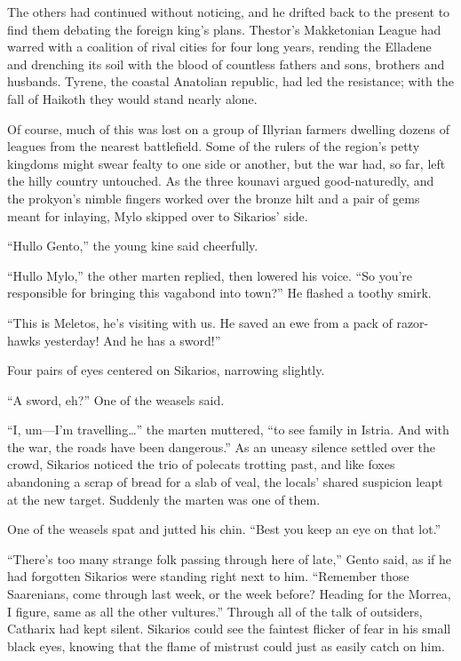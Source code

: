 The others had continued without noticing, and he drifted back to the present to find them debating the foreign king's plans. Thestor's Makketonian League had warred with a coalition of rival cities for four long years, rending the Elladene and drenching its soil with the blood of countless fathers and sons, brothers and husbands. Tyrene, the coastal Anatolian republic, had led the resistance; with the fall of Haikoth they would stand nearly alone.

Of course, much of this was lost on a group of Illyrian farmers dwelling dozens of leagues from the nearest battlefield. Some of the rulers of the region's petty kingdoms might swear fealty to one side or another, but the war had, so far, left the hilly country untouched. As the three kounavi argued good-naturedly, and the prokyon's nimble fingers worked over the bronze hilt and a pair of gems meant for inlaying, Mylo skipped over to Sikarios' side.

``Hullo Gento,'' the young kine said cheerfully.

``Hullo Mylo,'' the other marten replied, then lowered his voice. ``So you're responsible for bringing this vagabond into town?'' He flashed a toothy smirk.

``This is Meletos, he's visiting with us. He saved an ewe from a pack of razor-hawks yesterday! And he has a sword!''

Four pairs of eyes centered on Sikarios, narrowing slightly.

``A sword, eh?'' One of the weasels said.

``I, um---I'm travelling\ldots'' the marten muttered, ``to see family in Istria. And with the war, the roads have been dangerous.'' As an uneasy silence settled over the crowd, Sikarios noticed the trio of polecats trotting past, and like foxes abandoning a scrap of bread for a slab of veal, the locals' shared suspicion leapt at the new target. Suddenly the marten was one of them.

One of the weasels spat and jutted his chin. ``Best you keep an eye on that lot.''

``There's too many strange folk passing through here of late,'' Gento said, as if he had forgotten Sikarios were standing right next to him. ``Remember those Saarenians, come through last week, or the week before? Heading for the Morrea, I figure, same as all the other vultures.'' Through all of the talk of outsiders, Catharix had kept silent. Sikarios could see the faintest flicker of fear in his small black eyes, knowing that the flame of mistrust could just as easily catch on him.

